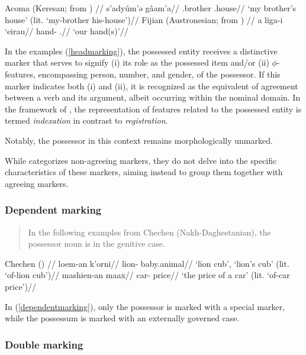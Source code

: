 \pex\label{headmarking}
\a
\begingl
\glpreamble Acoma (Keresan; \citealt[177]{Miller-1965} from \citealt{nichols_locus_2013}) //
\gla s'adyúm'ə gâam'a//
\glb \Fsg.brother \Tsg.house//
\glft `my brother's house' (lit. `my-brother his-house')//
\endgl
\a
\begingl
\glpreamble Fijian (Austronesian; \citealt[36]{Dixon-1988} from \citealt{nichols_locus_2013}) //
\gla a liga-i ‘eirau//
\glb \Art{} hand-\Poss{} \Fdu.\Excl{}//
\glft `our hand(s)'//
\endgl

\xe 

In the examples (\ref{headmarking}), the possessed entity receives a distinctive marker that serves to signify (i) its role as the possessed item and/or (ii) $\phi$-features, encompassing person, number, and gender, of the possessor. If this marker indicates both (i) and (ii), it is recognized as the equivalent of agreement between a verb and its argument, albeit occurring within the nominal domain. In the framework of \cite{lander2020head}, the representation of features related to the possessed entity is termed \textit{indexation} in contrast to \textit{registration}.

Notably, the possessor in this context remains morphologically unmarked.

While \cite{nichols_locus_2013} categorizes non-agreeing markers, they do not delve into the specific characteristics of these markers, aiming instead to group them together with agreeing markers.

\subsubsection{Dependent marking}

\begin{quote}
    In the following examples from Chechen (Nakh-Daghestanian), the possessor noun is in the genitive case. \citep{nichols_locus_2013}
\end{quote}


\pex\label{dependentmarking}
\glpreamble Chechen (\citealt{nichols_locus_2013}) //
\a
\begingl
\gla loem-an k'orni//
\glb lion-\Gen{} baby.animal//
\glft `lion cub’, `lion's cub’ (lit. `of-lion cub’)//
\endgl
\a
\begingl
\gla mashien-an maax//
\glb car-\Gen{} price//
\glft `the price of a car' (lit. `of-car price')// 
\endgl
\xe

In (\ref{dependentmarking}), only the possessor is marked with a special marker, while the possessum is marked with an externally governed case.

\subsubsection{Double marking}

